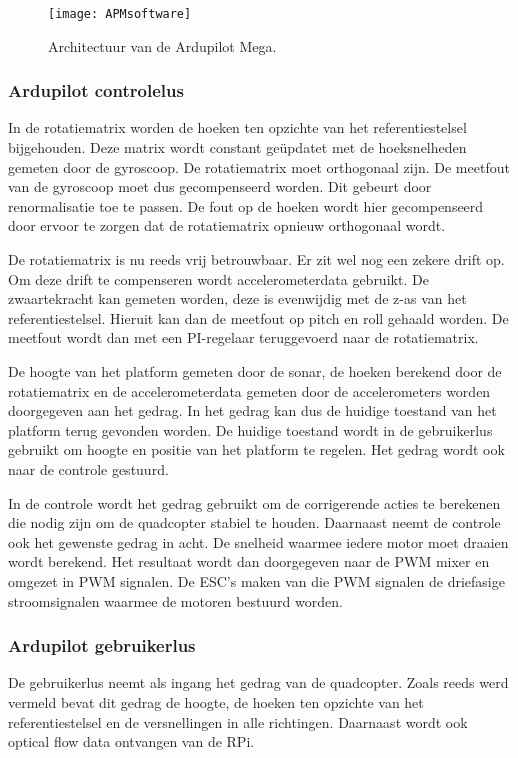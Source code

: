 \begin{figure}[h]
	\centering
	\texttt{[image: APMsoftware]}
	\caption{Architectuur van de Ardupilot Mega.}
	\label{fig:APMsoftware}
\end{figure}

\subsubsection{Ardupilot controlelus}
In de rotatiematrix worden de hoeken ten opzichte van het referentiestelsel bijgehouden. Deze matrix wordt constant ge\"updatet met de hoeksnelheden gemeten door de gyroscoop. De rotatiematrix moet orthogonaal zijn. De meetfout van de gyroscoop moet dus gecompenseerd worden. Dit gebeurt door renormalisatie toe te passen. De fout op de hoeken wordt hier gecompenseerd door ervoor te zorgen dat de rotatiematrix opnieuw orthogonaal wordt.

\npar De rotatiematrix is nu reeds vrij betrouwbaar. Er zit wel nog een zekere drift op. Om deze drift te compenseren wordt accelerometerdata gebruikt. De zwaartekracht kan gemeten worden, deze is evenwijdig met de z-as van het referentiestelsel. Hieruit kan dan de meetfout op pitch en roll gehaald worden. De meetfout wordt dan met een PI-regelaar teruggevoerd naar de rotatiematrix.

\npar De hoogte van het platform gemeten door de sonar, de hoeken berekend door de rotatiematrix en de accelerometerdata gemeten door de accelerometers worden doorgegeven aan het gedrag. In het gedrag kan dus de huidige toestand van het platform terug gevonden worden. De huidige toestand wordt in de gebruikerlus gebruikt om hoogte en positie van het platform te regelen. Het gedrag wordt ook naar de controle gestuurd.

\npar In de controle wordt het gedrag gebruikt om de corrigerende acties te berekenen die nodig zijn om de quadcopter stabiel te houden. Daarnaast neemt de controle ook het gewenste gedrag in acht. De snelheid waarmee iedere motor moet draaien wordt berekend. Het resultaat wordt dan doorgegeven naar de PWM mixer en omgezet in PWM signalen. De ESC's maken van die PWM signalen de driefasige stroomsignalen waarmee de motoren bestuurd worden.

\subsubsection{Ardupilot gebruikerlus}
De gebruikerlus neemt als ingang het gedrag van de quadcopter. Zoals reeds werd vermeld bevat dit gedrag de hoogte, de hoeken ten opzichte van het referentiestelsel en de versnellingen in alle richtingen. Daarnaast wordt ook optical flow data ontvangen van de RPi.

